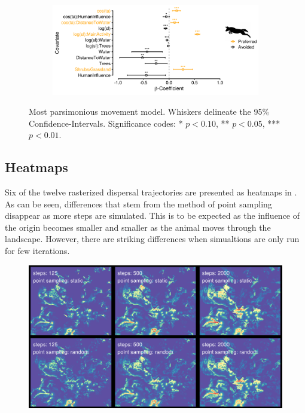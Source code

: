 \documentclass[abstract=on,10pt,a4paper,bibliography=totocnumbered]{article}
\begin{document}
\begin{figure}
  \begin{center}
    \begin{subfigure}[c]{0.8\textwidth}
      \includegraphics[width=\textwidth]{99_MovementModel}
    \end{subfigure}
    \caption{Most parsimonious movement model. Whiskers delineate the 95\%
    Confidence-Intervals. Significance codes: * \(p < 0.10\), ** \(p < 0.05\),
    *** \(p < 0.01\).}
    \label{MovementModel}
  \end{center}
\end{figure}

\subsection{Heatmaps}
Six of the twelve rasterized dispersal trajectories are presented as heatmaps in
. As can be seen, differences that stem from the method of point
sampling disappear as more steps are simulated. This is to be expected as the
influence of the origin becomes smaller and smaller as the animal moves through
the landscape. However, there are striking differences when simualtions are only
run for few iterations.

\begin{figure}
  \includegraphics[width=\textwidth]{99_Heatmaps}
  \caption{}
  \label{Heatmaps}
\end{figure}
\end{document}
